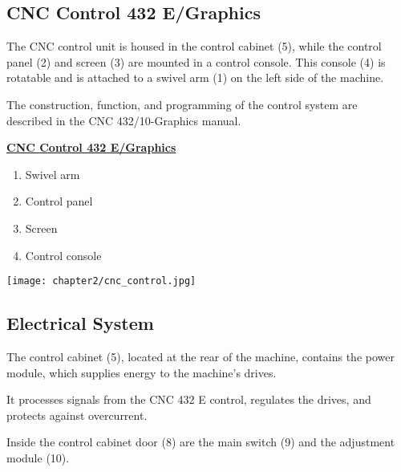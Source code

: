 \newpage

\subsection{CNC Control 432 E/Graphics}

The CNC control unit is housed in the control cabinet (5), while the control panel (2) and screen (3) are mounted in a control console. This console (4) is rotatable and is attached to a swivel arm (1) on the left side of the machine.

The construction, function, and programming of the control system are \\described in the CNC 432/10-Graphics manual.

\vspace{-.3cm}


\begin{minipage}[b]{0.5\textwidth}
    \textbf{\uline{CNC Control 432 E/Graphics}}
    \begin{enumerate}[itemsep=1pt,parsep=0pt]
        \item Swivel arm
        \item Control panel
        \item Screen
        \item Control console
    \end{enumerate}
\end{minipage}%
\begin{minipage}{0.5\textwidth}
    \centering
    \texttt{[image: chapter2/cnc\_control.jpg]}
    \label{fig:cnc_control}
\end{minipage}

\vspace{-1cm}

\subsection{Electrical System}

The control cabinet (5), located at the rear of the machine, contains the power module, which supplies energy to the machine’s drives.

It processes signals from the CNC 432 E control, regulates the drives, and protects against overcurrent.

Inside the control cabinet door (8) are the main switch (9) and the adjustment module (10).

